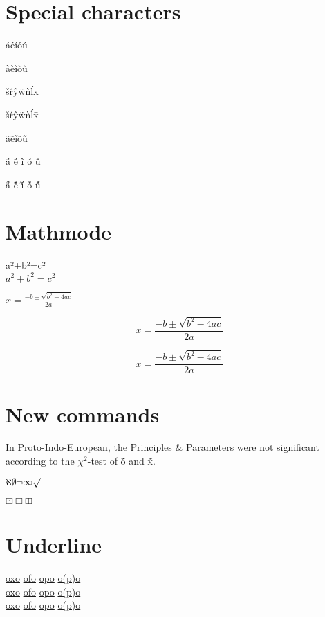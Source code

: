 \section{Special characters}
áéíóú

àèìòù

šŕŷẅǹĺ̄x

\v s\'r\^y\"w\`n\'l\=x 

ãẽĩõũ

{\'{\~{a}}}
{\'{\~{e}}}
{\'{\~{i}}}
{\'{\~{o}}}
{\'{\~{u}}}

{\~{\'{a}}}
{\~{\'{e}}}
{\~{\'{i}}}
{\~{\'{o}}}
{\~{\'{u}}}

\section{Mathmode}

\noindent
a²+b²=c²\\
$a^2+b^2=c^2$

$x = \frac{-b \pm \sqrt{b^2-4ac}}{2a} $

$$x = \frac{-b \pm \sqrt{b^2-4ac}}{2a} $$

\[x = \frac{-b \pm \sqrt{b^2-4ac}}{2a}\]


\section{New commands}
\newcommand{\PIE}{Proto-Indo-European}
\newcommand{\PP}{Principles \& Parameters}
\newcommand{\chisquare}{$\chi^2$}
\newcommand{\macronacuteo}{\'{\={o}}}
\newcommand{\macronacute}[1]{\'{\={#1}}}

In {\PIE}, the {\PP} were not significant according to the {\chisquare}-test of \macronacuteo{} and \macronacute{x}.

$\aleph \emptyset \neg \infty \surd$

\textinterrobang \textreferencemark \texttildelow $\boxdot\boxminus\boxplus$

\section{Underline}
 \underline{oxo} \underline{ofo} \underline{opo} \underline{o(p)o}\\
 \uline{oxo} \uline{ofo} \uline{opo} \uline{o(p)o}\\
 \ul{oxo} \ul{ofo} \ul{opo} \ul{o(p)o}\\
 